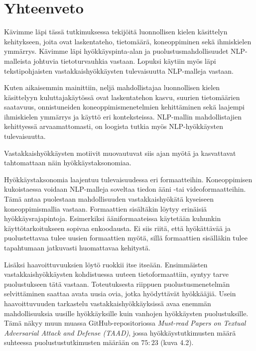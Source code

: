 \chapter{Yhteenveto\label{conclusions}}

Kävimme läpi tässä tutkimuksessa tekijöitä luonnollisen kielen käsittelyn kehitykseen, joita ovat laskentateho, tietomäärä, koneoppiminen sekä ihmiskielen ymmärrys. Kävimme läpi hyökkäyspinta-alan ja puolustusmahdollisuudet NLP-malleista johtuvia tietoturvauhkia vastaan. Lopuksi käytiin myös läpi tekstipohjaisten vastakkaishyökkäysten tulevaisuutta NLP-malleja vastaan.

Kuten aikaisemmin mainittiin, neljä mahdollistajaa luonnollisen kielen käsittelyyn kuluttajakäytössä ovat laskentatehon kasvu, suurien tietomäärien saatavuus, onnistuneiden koneoppimismenetelmien kehittäminen sekä laajempi ihmiskielen ymmärrys ja käyttö eri konteksteissa. NLP-mallin mahdollistajien kehittyessä arvaamattomasti, on loogista tutkia myös NLP-hyökkäysten tulevaisuutta. 

Vastakkaishyökkäysten motiivit muovautuvat siis ajan myötä ja kasvattavat tahtomattaan näin hyökkäystaksonomiaa. 

Hyökkäystaksonomia laajentuu tulevaisuudessa eri formaatteihin. Koneoppimisen kukoistaessa voidaan NLP-malleja soveltaa tiedon ääni -tai videoformaatteihin. Tämä antaa puolestaan mahdollisuuden vastakkaishyökätä kyseiseen koneoppimismallia vastaan. Formaattien sisältäkin löytyy erinäisiä hyökkäysrajapintoja. Esimerkiksi ääniformaateissa käytetään kuhunkin käyttötarkoitukseen sopivaa enkoodausta. Ei siis riitä, että hyökättävää ja puolustettavaa tulee uusien formaattien myötä, sillä formaattien sisälläkin tulee tapahtumaan jatkuvasti huomattavaa kehitystä.

Lisäksi haavoittuvuuksien löytö ruokkii itse itseään. Ensimmäisten vastakkaishyökkäysten kohdistuessa uuteen tietoformaattiin, syntyy tarve puolustukseen tätä vastaan. Toteutuksesta riippuen puolustusmenetelmän selvittäminen saattaa avata uusia ovia, jotka hyödyttävät hyökkääjiä. Usein haavoittuvuuden tarkastelu vastakkaishyökkäyksissä avaa enemmän mahdollisuuksia uusille hyökkäyksille kuin vanhojen hyökkäysten puolustuksille. Tämä näkyy muun muassa GitHub-repositoriossa \textit{Must-read Papers on Textual Adversarial Attack and Defense (TAAD)}, jossa hyökkäystutkimusten määrä suhteessa puolustustutkimusten määrään on $75:23$ (kuva 4.2).

